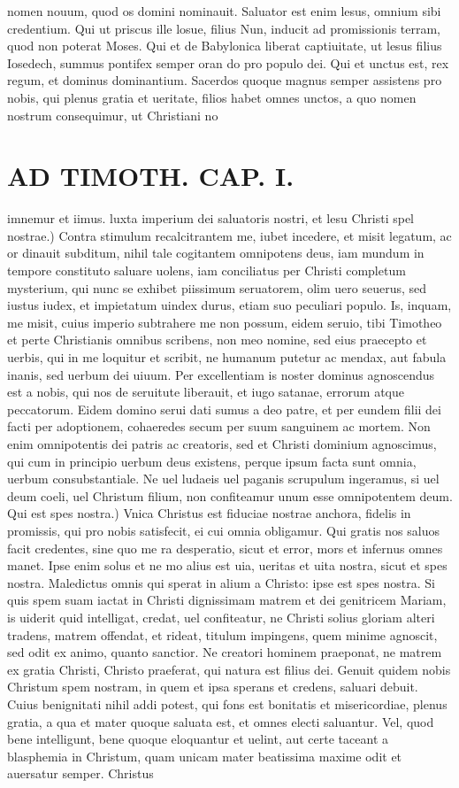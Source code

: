 \documentclass{article}
\begin{document}
\begin{pages}
nomen nouum, quod os domini nominauit. Saluator est enim lesus, omnium sibi credentium. Qui ut priscus ille losue, filius Nun, inducit ad promissionis terram, quod non poterat Moses. Qui et de Babylonica liberat captiuitate, ut lesus filius Iosedech, summus pontifex semper oran do pro populo dei. Qui et unctus est, rex regum, et dominus dominantium. Sacerdos quoque magnus semper assistens pro nobis, qui plenus gratia et ueritate, filios habet omnes unctos, a quo nomen nostrum consequimur, ut Christiani no\pend
\section*{AD TIMOTH. CAP. I. }
\marginpar{[ p.465 ]}\pstart imnemur et iimus. luxta imperium dei saluatoris nostri, et lesu Christi spel nostrae.) Contra stimulum recalcitrantem me, iubet incedere, et misit legatum, ac or dinauit subditum, nihil tale cogitantem omnipotens deus, iam mundum in tempore constituto saluare uolens, iam conciliatus per Christi completum mysterium, qui nunc se exhibet piissimum seruatorem, olim uero seuerus, sed iustus iudex, et impietatum uindex durus, etiam suo peculiari populo. Is, inquam, me misit, cuius imperio subtrahere me non possum, eidem seruio, tibi Timotheo et perte Christianis omnibus scribens, non meo nomine, sed eius praecepto et uerbis, qui in me loquitur et scribit, ne humanum putetur ac mendax, aut fabula inanis, sed uerbum dei uiuum. Per excellentiam is noster dominus agnoscendus est a nobis, qui nos de seruitute liberauit, et iugo satanae, errorum atque peccatorum. Eidem domino serui dati sumus a deo patre, et per eundem filii dei facti per adoptionem, cohaeredes secum per suum sanguinem ac mortem. Non enim omnipotentis dei patris ac creatoris, sed et Christi dominium agnoscimus, qui cum in principio uerbum deus existens, perque ipsum facta sunt omnia, uerbum consubstantiale. Ne uel ludaeis uel paganis scrupulum ingeramus, si uel deum coeli, uel Christum filium, non confiteamur unum esse omnipotentem deum. Qui est spes nostra.) Vnica Christus est fiduciae nostrae anchora, fidelis in promissis, qui pro nobis satisfecit, ei cui omnia obligamur. Qui gratis nos saluos facit credentes, sine quo me ra desperatio, sicut et error, mors et infernus omnes manet. Ipse enim solus et ne mo alius est uia, ueritas et uita nostra, sicut et spes nostra. Maledictus omnis qui sperat in alium a Christo: ipse est spes nostra. Si quis spem suam iactat in Christi dignissimam matrem et dei genitricem Mariam, is uiderit quid intelligat, credat, uel confiteatur, ne Christi solius gloriam alteri tradens, matrem offendat, et rideat, titulum impingens, quem minime agnoscit, sed odit ex animo, quanto sanctior. Ne creatori hominem praeponat, ne matrem ex gratia Christi, Christo praeferat, qui natura est filius dei. Genuit quidem nobis Christum spem nostram, in quem et ipsa sperans et credens, saluari debuit. Cuius benignitati nihil addi potest, qui fons est bonitatis et misericordiae, plenus gratia, a qua et mater quoque saluata est, et omnes electi saluantur. Vel, quod bene intelligunt, bene quoque eloquantur et uelint, aut certe taceant a blasphemia in Christum, quam unicam mater beatissima maxime odit et auersatur semper. Christus 
\end{pages}
\end{document}
